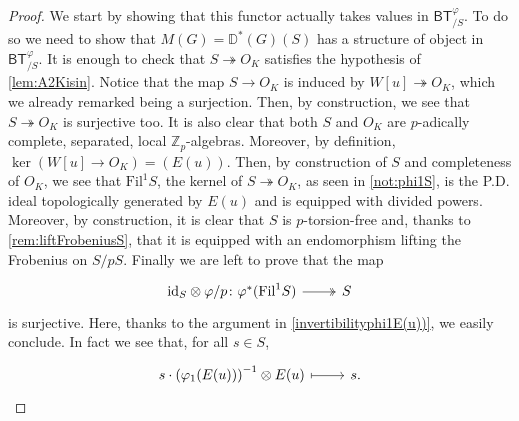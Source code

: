 \begin{proof}\leavevmode\vspace{-.2\baselineskip}
We start by showing that this functor actually takes values in $\mathsf{BT}^{\varphi}_{/S}$.
To do so we need to show that $M(G) = \mathbb{D}^{*}(G)(S)$
has a structure of object in $\mathsf{BT}^{\varphi}_{/S}$.
It is enough to check that $S \twoheadrightarrow O_K$ satisfies
the hypothesis of \cref{lem:A2Kisin}.
Notice that the map $S \to O_K$ is induced by $W[u] \twoheadrightarrow O_K$,
which we already remarked being a surjection.
Then, by construction, we see that $S \twoheadrightarrow O_K$
is surjective too.
It is also clear that both $S$ and $O_K$ are 
$p$-adically complete, separated, local $\mathbb{Z}_{p}$-algebras.
Moreover, by definition, $\ker (W[u] \to O_K) = (E(u))$.
Then, by construction of $S$ and completeness of $O_K$,
we see that $\mathrm{Fil}^1 S$, the kernel of $S \twoheadrightarrow O_K$, 
as seen in \cref{not:phi1S}, is the P.D. ideal topologically generated by $E(u)$ and is
equipped with divided powers.
Moreover, by construction, it is clear that $S$ is $p$-torsion-free
and, thanks to \cref{rem:liftFrobeniusS},
that it is equipped with an endomorphism lifting the Frobenius on $S/pS$.
Finally we are left to prove that the map
\begin{equation*}
\begin{tikzcd}[row sep = 0ex
	,/tikz/column 1/.append style={anchor=base east}
	,/tikz/column 2/.append style={anchor=base west}]
	\mathrm{id}_{ S } \otimes \varphi/p \colon 
	\varphi^*(\mathrm{Fil}^1 S) \arrow[r, "", twoheadrightarrow] &
	S
\end{tikzcd}
\end{equation*} 
is surjective.
Here, thanks to the argument in \cref{invertibilityphi1E(u))}, we easily conclude.
In fact we see that, for all $s \in S$,
\begin{equation*}
\begin{tikzcd}[row sep = 0ex
	,/tikz/column 1/.append style={anchor=base east}
	,/tikz/column 2/.append style={anchor=base west}]
	s \cdot \left( \varphi_1(E(u)) \right)^{-1} \otimes E(u) 
	\arrow[r, "", mapsto] & 
	s
.\end{tikzcd}
\end{equation*} 




\end{proof}
